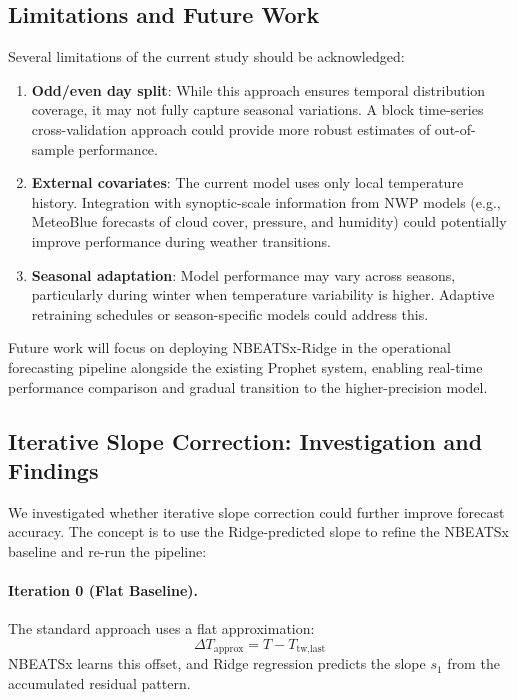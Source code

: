 \documentclass[11pt]{article}
\begin{document}
\subsection{Limitations and Future Work}

Several limitations of the current study should be acknowledged:

\begin{enumerate}
    \item \textbf{Odd/even day split}: While this approach ensures temporal distribution coverage, it may not fully capture seasonal variations. A block time-series cross-validation approach could provide more robust estimates of out-of-sample performance.

    \item \textbf{External covariates}: The current model uses only local temperature history. Integration with synoptic-scale information from NWP models (e.g., MeteoBlue forecasts of cloud cover, pressure, and humidity) could potentially improve performance during weather transitions.

    \item \textbf{Seasonal adaptation}: Model performance may vary across seasons, particularly during winter when temperature variability is higher. Adaptive retraining schedules or season-specific models could address this.
\end{enumerate}

Future work will focus on deploying NBEATSx-Ridge in the operational forecasting pipeline alongside the existing Prophet system, enabling real-time performance comparison and gradual transition to the higher-precision model.

\subsection{Iterative Slope Correction: Investigation and Findings}

We investigated whether iterative slope correction could further improve forecast accuracy. The concept is to use the Ridge-predicted slope to refine the NBEATSx baseline and re-run the pipeline:

\paragraph{Iteration 0 (Flat Baseline).}
The standard approach uses a flat approximation:
\begin{equation}
\Delta T_{\text{approx}} = T - T_{\text{tw,last}}
\end{equation}
NBEATSx learns this offset, and Ridge regression predicts the slope $s_1$ from the accumulated residual pattern.
\end{document}
